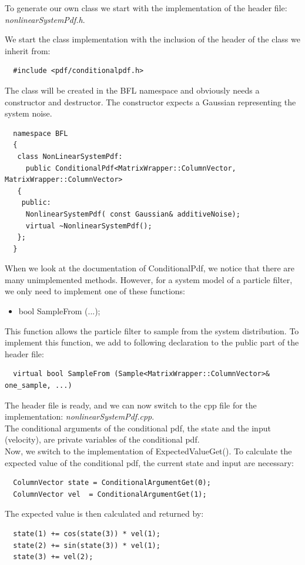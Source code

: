 \documentclass[a4paper,10pt]{report}
\begin{document}
To generate our own class we start with the implementation of the
header file: \emph{nonlinearSystemPdf.h}.

We start the class implementation with the inclusion of the header of
the class we inherit from:
\begin{verbatim}
  #include <pdf/conditionalpdf.h>
\end{verbatim}
The class will be created in the BFL namespace and obviously needs a
constructor and destructor. The constructor expects a Gaussian
representing the system noise.
\begin{verbatim}
  namespace BFL
  {
   class NonLinearSystemPdf: 
     public ConditionalPdf<MatrixWrapper::ColumnVector, MatrixWrapper::ColumnVector>
   {
    public:
     NonlinearSystemPdf( const Gaussian& additiveNoise);
     virtual ~NonlinearSystemPdf();
   };
  }
\end{verbatim}
When we look at the documentation of ConditionalPdf, we notice that
there are many unimplemented methods. However, for a system model of a
particle filter, we only need to implement one of these functions:
\begin{itemize}
  \item bool SampleFrom (...);
\end{itemize}
This function allows the particle filter to sample from the system
distribution. To implement this function, we add to following
declaration to the public part of the header file:
\begin{verbatim}
  virtual bool SampleFrom (Sample<MatrixWrapper::ColumnVector>& one_sample, ...)
\end{verbatim}
The header file is ready, and we can now switch to the cpp file for
the implementation:
\emph{nonlinearSystemPdf.cpp}.\\
The conditional arguments of the conditional pdf, the state and the
input (velocity), are private variables of the conditional pdf.\\
Now, we switch to the implementation of ExpectedValueGet().  To
calculate the expected value of the conditional pdf, the current state
and input are necessary:
\begin{verbatim}
  ColumnVector state = ConditionalArgumentGet(0);
  ColumnVector vel  = ConditionalArgumentGet(1);
\end{verbatim}
The expected value is then calculated and returned by:
\begin{verbatim}
  state(1) += cos(state(3)) * vel(1);
  state(2) += sin(state(3)) * vel(1);
  state(3) += vel(2);
\end{verbatim}
\end{document}
